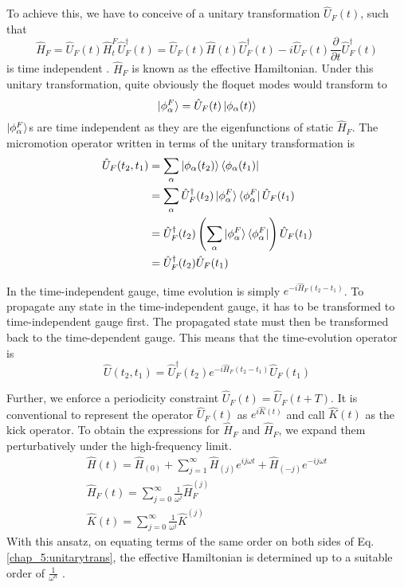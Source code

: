 To achieve this, we have to conceive of a unitary transformation $\hat{U}_{F}(t)$, such that 
\begin{equation}
 \label{chap_5:unitarytrans}\hat{H}_{F} = \hat{U}_{F}(t)\hat{H}_{t}^{F}\hat{U}_{F}^{\dagger}(t) = \hat{U}_{F}(t)\hat{H}(t)\hat{U}_{F}^{\dagger}(t) - i\hat{U}_{F}(t)\frac{\partial}{\partial t}\hat{U}_{F}^{\dagger}(t)
\end{equation} is time independent \cite{rahav2003effective, anisimovas2015high}. $\hat{H}_{F}$ is known as the effective Hamiltonian. Under this unitary transformation, quite obviously the floquet modes would transform to
\begin{equation}
 \ket{\phi_\alpha^{F}} = \hat{U}_{F}(t)\ket{\phi_\alpha (t)}
\end{equation} $\ket{\phi_\alpha^{F}}$s are time independent as they are the eigenfunctions of static $\hat{H}_{F}$.
The micromotion operator written in terms of the unitary transformation is
\begin{align}
 \hat{U}_{F}(t_2, t_1) &= \sum_{\alpha}{\ket{\phi_\alpha (t_2)}\bra{\phi_\alpha (t_1)}} \nonumber \\
 &= \sum_{\alpha}{\hat{U}_{F}^{\dagger}(t_2)\ket{\phi_\alpha^{F}}\bra{\phi_\alpha^{F}}\hat{U}_{F}(t_1)} \nonumber \\
 &= \hat{U}_{F}^{\dagger}(t_2)\left(\sum_{\alpha}{\ket{\phi_\alpha^{F}}\bra{\phi_\alpha^{F}}}\right)\hat{U}_{F}(t_1) \nonumber \\
 &= \hat{U}_{F}^{\dagger}(t_2)\hat{U}_{F}(t_1)
\end{align}

In the time-independent gauge, time evolution is simply $e^{-i\hat{H}_{F}(t_2 - t_1)}$. To propagate any state in the time-independent gauge, it has to be transformed to 
time-independent gauge first. The propagated state must then be transformed back to the time-dependent gauge. This means that the time-evolution operator is
\begin{equation}
  \hat{U}(t_2, t_1) = \hat{U}_{F}^{\dagger}(t_2)e^{-i\hat{H}_{F}(t_2 - t_1)}\hat{U}_{F}(t_1)
\end{equation} 

Further, we enforce a periodicity constraint $\hat{U}_{F}(t) = \hat{U}_{F}(t+T)$. It is conventional to represent the operator $\hat{U}_{F}(t)$ as $e^{i\hat{K}(t)}$ and call $\hat{K}(t)$ as the kick operator.
To obtain the expressions for $\hat{H}_{F}$ and $\hat{H}_{F}$, we expand them perturbatively under the high-frequency limit.
\begin{gather}
 \hat{H}(t) = \hat{H}_{(0)} + \sum_{j=1}^{\infty}{\hat{H}_{(j)} e^{ij\omega t} + \hat{H}_{(-j)} e^{-ij\omega t}} \\
 \hat{H}_{F}(t) = \sum_{j=0}^{\infty}{\frac{1}{\omega^j}\hat{H}_{F}^{(j)}} \\
 \hat{K}(t) = \sum_{j=0}^{\infty}{\frac{1}{\omega^j}\hat{K}^{(j)}}
\end{gather}
With this ansatz, on equating terms of the same order on both sides of Eq. \eqref{chap_5:unitarytrans}, the effective Hamiltonian is determined up to a suitable order of 
$\frac{1}{\omega^n}$ \cite{goldman2014periodically}.

